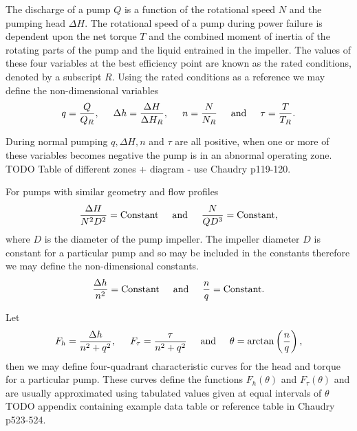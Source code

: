 \documentclass[12pt]{article}
\begin{document}
The discharge of a pump $Q$ is a function of the rotational speed $N$ and the pumping head $\Delta H$. The rotational speed of a pump during power failure is dependent upon the net torque $T$ and the combined moment of inertia of the rotating parts of the pump and the liquid entrained in the impeller. The values of these four variables at the best efficiency point are known as the rated conditions, denoted by a subscript $R$. Using the rated conditions as a reference we may define the non-dimensional variables
\begin{align*}
q = \frac{Q}{Q_R}, \hspace{0.5cm} \Delta h = \frac{\Delta H}{\Delta H_R}, \hspace{0.5cm} n = \frac{N}{N_R} \hspace{0.5cm} \text{and} \hspace{0.5cm} \tau = \frac{T}{T_R}.
\end{align*}

During normal pumping $q, \Delta H, n$ and $\tau$ are all positive, when one or more of these variables becomes negative the pump is in an abnormal operating zone. {\color{red} TODO Table of different zones + diagram - use Chaudry p119-120}. 

For pumps with similar geometry and flow profiles 
\begin{align*}
\frac{\Delta H}{N^2 D^2} = \text{Constant} \hspace{0.5cm} \text{and} \hspace{0.5cm} \frac{N}{Q D^3} = \text{Constant},
\end{align*}  
where $D$ is the diameter of the pump impeller. The impeller diameter $D$ is constant for a particular pump and so may be included in the constants therefore we may define the non-dimensional constants. 
\begin{align*}
\frac{\Delta h}{n^2} = \text{Constant} \hspace{0.5cm} \text{and} \hspace{0.5cm} \frac{n}{q} = \text{Constant}.
\end{align*} 

Let 
\begin{align*}
F_h = \frac{\Delta h}{n^2 + q^2}, \hspace{0.5cm} F_{\tau} = \frac{\tau}{n^2 + q^2} \hspace{0.5cm} \text{and} \hspace{0.5cm} \theta = \arctan\left( \frac{n}{q} \right), 
\end{align*}
then we may define four-quadrant characteristic curves for the head and torque for a particular pump. These curves define the functions $F_h(\theta)$ and $F_{\tau}(\theta)$ and are usually approximated using tabulated values given at equal intervals of $\theta$ {\color{red} TODO appendix containing example data table or reference table in Chaudry p523-524}. 
\end{document}
